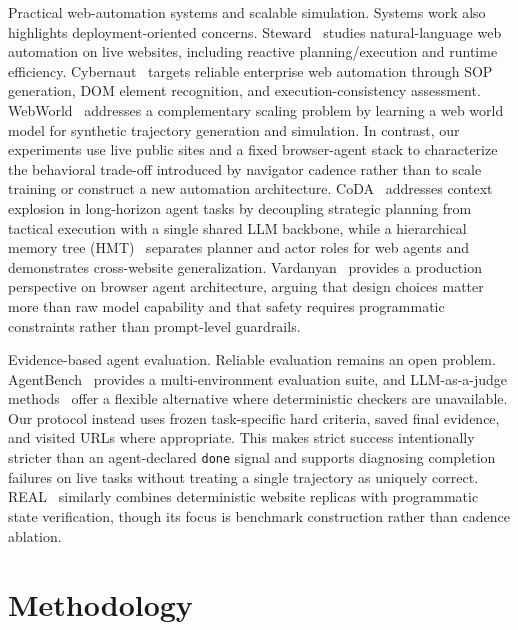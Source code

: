\documentclass{llncs}
\DeclareRobustCommand{\code}[1]{\allowbreak\nolinkurl{#1}\allowbreak}
\begin{document}
Practical web-automation systems and scalable simulation.
Systems work also highlights deployment-oriented concerns. Steward~\cite{wang2024steward}
studies natural-language web automation on live websites, including reactive
planning/execution and runtime efficiency. Cybernaut~\cite{park2025cybernaut}
targets reliable enterprise web automation through SOP generation, DOM element
recognition, and execution-consistency assessment. WebWorld~\cite{yao2025webworld}
addresses a complementary scaling problem by learning a web world model for
synthetic trajectory generation and simulation. In contrast, our experiments use
live public sites and a fixed browser-agent stack to characterize the behavioral
trade-off introduced by navigator cadence rather than to scale training or
construct a new automation architecture.
CoDA~\cite{liu2026coda} addresses context explosion in long-horizon agent
tasks by decoupling strategic planning from tactical execution with a single
shared LLM backbone, while a hierarchical memory tree
(HMT)~\cite{tan2026hmt} separates planner and actor roles for web agents and
demonstrates cross-website generalization. Vardanyan~\cite{vardanyan2025building}
provides a production perspective on browser agent architecture, arguing
that design choices matter more than raw model capability and that safety
requires programmatic constraints rather than prompt-level guardrails.

Evidence-based agent evaluation.
Reliable evaluation remains an open problem. AgentBench~\cite{liu2024agentbench}
provides a multi-environment evaluation suite, and LLM-as-a-judge
methods~\cite{zheng2023judging} offer a flexible alternative where deterministic
checkers are unavailable. Our protocol instead uses frozen task-specific hard
criteria, saved final evidence, and visited URLs where appropriate. This makes
strict success intentionally stricter than an agent-declared \code{done} signal
and supports diagnosing completion failures on live tasks without treating a
single trajectory as uniquely correct.
REAL~\cite{garg2025real} similarly combines deterministic website replicas
with programmatic state verification, though its focus is benchmark
construction rather than cadence ablation.


\section{Methodology}
\end{document}
